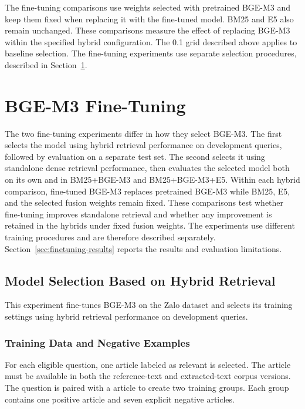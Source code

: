 The fine-tuning comparisons use weights selected with pretrained BGE-M3 and keep them fixed when replacing it with the fine-tuned model. BM25 and E5 also remain unchanged. These comparisons measure the effect of replacing BGE-M3 within the specified hybrid configuration. The 0.1 grid described above applies to baseline selection. The fine-tuning experiments use separate selection procedures, described in Section~\ref{sec:bge-finetuning}.

\section{BGE-M3 Fine-Tuning}
\label{sec:bge-finetuning}

The two fine-tuning experiments differ in how they select BGE-M3. The first selects the model using hybrid retrieval performance on development queries, followed by evaluation on a separate test set. The second selects it using standalone dense retrieval performance, then evaluates the selected model both on its own and in BM25+BGE-M3 and BM25+BGE-M3+E5. Within each hybrid comparison, fine-tuned BGE-M3 replaces pretrained BGE-M3 while BM25, E5, and the selected fusion weights remain fixed. These comparisons test whether fine-tuning improves standalone retrieval and whether any improvement is retained in the hybrids under fixed fusion weights. The experiments use different training procedures and are therefore described separately. Section~\ref{sec:finetuning-results} reports the results and evaluation limitations.

\subsection{Model Selection Based on Hybrid Retrieval}
\label{sec:finetuning-hybrid-selection}

This experiment fine-tunes BGE-M3 on the Zalo dataset and selects its training settings using hybrid retrieval performance on development queries.

\subsubsection{Training Data and Negative Examples}

For each eligible question, one article labeled as relevant is selected. The article must be available in both the reference-text and extracted-text corpus versions. The question is paired with a article to create two training groups. Each group contains one positive article and seven explicit negative articles.

